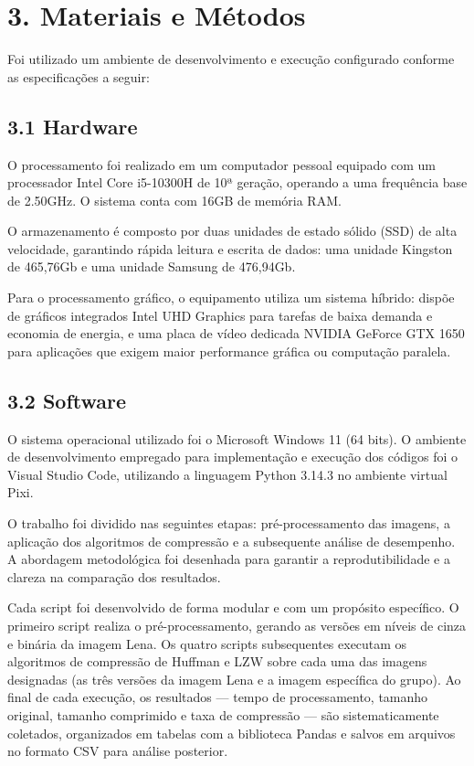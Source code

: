 \documentclass{report}
\begin{document}
\section*{3. Materiais e Métodos}

Foi utilizado um ambiente de desenvolvimento e execução configurado conforme as especificações a seguir:

\subsection*{3.1 Hardware}
O processamento foi realizado em um computador pessoal equipado com um processador Intel Core i5-10300H de 10ª geração, operando a uma frequência base de 2.50GHz. O sistema conta com 16GB de memória RAM.

O armazenamento é composto por duas unidades de estado sólido (SSD) de alta velocidade, garantindo rápida leitura e escrita de dados: uma unidade Kingston de 465,76Gb e uma unidade Samsung de 476,94Gb.

Para o processamento gráfico, o equipamento utiliza um sistema híbrido: dispõe de gráficos integrados Intel UHD Graphics para tarefas de baixa demanda e economia de energia, e uma placa de vídeo dedicada NVIDIA GeForce GTX 1650 para aplicações que exigem maior performance gráfica ou computação paralela.


\subsection*{3.2 Software}

O sistema operacional utilizado foi o Microsoft Windows 11 (64 bits). O ambiente de desenvolvimento empregado para implementação e execução dos códigos foi o Visual Studio Code, utilizando a linguagem Python 3.14.3 no ambiente virtual Pixi.  

O trabalho foi dividido nas seguintes etapas: pré-processamento das imagens, a aplicação dos algoritmos de compressão e a subsequente análise de desempenho. A abordagem metodológica foi desenhada para garantir a reprodutibilidade e a clareza na comparação dos resultados.

Cada script foi desenvolvido de forma modular e com um propósito específico. O primeiro script realiza o pré-processamento, gerando as versões em níveis de cinza e binária da imagem Lena. Os quatro scripts subsequentes executam os algoritmos de compressão de Huffman e LZW sobre cada uma das imagens designadas (as três versões da imagem Lena e a imagem específica do grupo). Ao final de cada execução, os resultados — tempo de processamento, tamanho original, tamanho comprimido e taxa de compressão — são sistematicamente coletados, organizados em tabelas com a biblioteca Pandas e salvos em arquivos no formato CSV para análise posterior.
\end{document}
